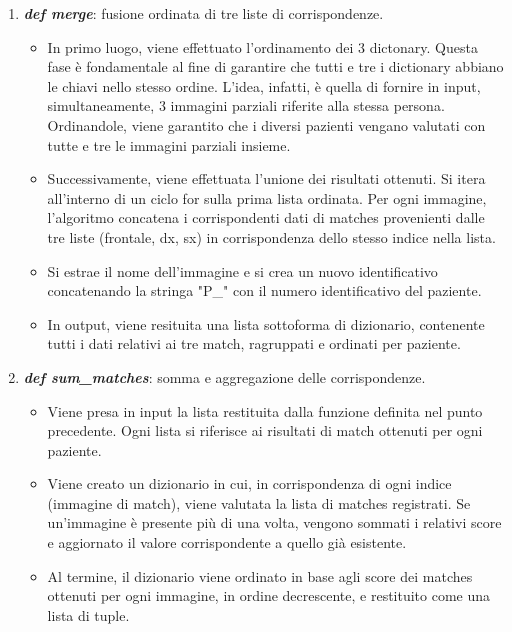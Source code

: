 \documentclass[12pt,a4paper,openright,twoside]{book}
\begin{document}
\begin{enumerate}
\item \textbf{{\itshape def merge}}: fusione ordinata di tre liste di corrispondenze.
\begin{itemize}
\item In primo luogo, viene effettuato l'ordinamento dei 3 dictonary. Questa fase è fondamentale al fine di garantire che tutti e tre i dictionary abbiano le chiavi nello stesso ordine. L'idea, infatti, è quella di fornire in input, simultaneamente, 3 immagini parziali riferite alla stessa persona. Ordinandole, viene garantito che i diversi pazienti vengano valutati con tutte e tre le immagini parziali insieme.
\item Successivamente, viene effettuata l'unione dei risultati ottenuti. Si itera all'interno di un ciclo for sulla prima lista ordinata. Per ogni immagine, l'algoritmo concatena i corrispondenti dati di matches provenienti dalle tre liste (frontale, dx, sx) in corrispondenza dello stesso indice nella lista.
\item Si estrae il nome dell'immagine e si crea un nuovo identificativo concatenando la stringa "P\_" con il numero identificativo del paziente.
\item In output, viene resituita una lista sottoforma di dizionario, contenente tutti i dati relativi ai tre match, ragruppati e ordinati per paziente. 
\end{itemize}

\item \textbf{{\itshape def sum\_matches}}: somma e aggregazione delle corrispondenze.
\begin{itemize}

\begin{figure}[H]
	\centering
    	
\end{figure} 

\item Viene presa in input la lista restituita dalla funzione definita nel punto precedente. Ogni lista si riferisce ai risultati di match ottenuti per ogni paziente.
\item Viene creato un dizionario in cui, in corrispondenza di ogni indice (immagine di match), viene valutata la lista di matches registrati. Se un'immagine è presente più di una volta, vengono sommati i relativi score e aggiornato il valore corrispondente a quello già esistente.
\item Al termine, il dizionario viene ordinato in base agli score dei matches ottenuti per ogni immagine, in ordine decrescente, e restituito come una lista di tuple.
\end{itemize}


\end{enumerate}
\end{document}
